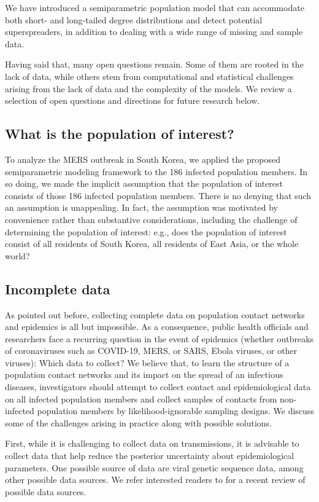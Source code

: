 \documentclass[12pt,usenatbib,referee]{article}
\begin{document}
We have introduced a semiparametric population model that can accommodate both short- and long-tailed degree distributions and detect potential superspreaders,
in addition to dealing with a wide range of missing and sample data.

Having said that,
many open questions remain.
Some of them are rooted in the lack of data,
while others stem from computational and statistical challenges arising from the lack of data and the complexity of the models.
We review a selection of open questions and directions for future research below.

\subsection{What is the population of interest?}

To analyze the MERS outbreak in South Korea,
we applied the proposed semiparametric modeling framework to the 186 infected population members.
In so doing,
we made the implicit assumption that the population of interest consists of those 186 infected population members.
There is no denying that such an assumption is unappealing.
In fact,
the assumption was motivated by convenience rather than substantive considerations,
including the challenge of determining the population of interest:
e.g.,
does the population of interest consist of all residents of South Korea,
all residents of East Asia,
or the whole world?

\subsection{Incomplete data}
\label{inc}

As pointed out before,
collecting complete data on population contact networks and epidemics is all but impossible.
As a consequence,
public health officials and researchers face a recurring question in the event of epidemics (whether outbreaks of coronaviruses such as COVID-19, MERS, or SARS, Ebola viruses, or other viruses): 
Which data to collect?
We believe that,
to learn the structure of a population contact networks and its impact on the spread of an infectious diseases,
 investigators should attempt to collect contact and epidemiological data on all infected population members and collect samples of contacts from non-infected population members by likelihood-ignorable sampling designs.
We discuss some of the challenges arising in practice along with possible solutions.

First,
while it is challenging to collect data on transmissions,
it is advisable to collect data that help reduce the posterior uncertainty about epidemiological parameters.
One possible source of data are viral genetic sequence data,
among other possible data sources.
We refer interested readers to \citet{beast} for a recent review of possible data sources.
\end{document}
